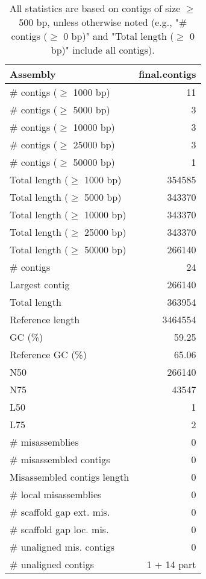 \documentclass[12pt,a4paper]{article}
\begin{document}
\begin{table}[ht]
\begin{center}
\caption{All statistics are based on contigs of size $\geq$ 500 bp, unless otherwise noted (e.g., "\# contigs ($\geq$ 0 bp)" and "Total length ($\geq$ 0 bp)" include all contigs).}
\begin{tabular}{|l*{1}{|r}|}
\hline
Assembly & final.contigs \\ \hline
\# contigs ($\geq$ 1000 bp) & 11 \\ \hline
\# contigs ($\geq$ 5000 bp) & 3 \\ \hline
\# contigs ($\geq$ 10000 bp) & 3 \\ \hline
\# contigs ($\geq$ 25000 bp) & 3 \\ \hline
\# contigs ($\geq$ 50000 bp) & 1 \\ \hline
Total length ($\geq$ 1000 bp) & 354585 \\ \hline
Total length ($\geq$ 5000 bp) & 343370 \\ \hline
Total length ($\geq$ 10000 bp) & 343370 \\ \hline
Total length ($\geq$ 25000 bp) & 343370 \\ \hline
Total length ($\geq$ 50000 bp) & 266140 \\ \hline
\# contigs & 24 \\ \hline
Largest contig & 266140 \\ \hline
Total length & 363954 \\ \hline
Reference length & 3464554 \\ \hline
GC (\%) & 59.25 \\ \hline
Reference GC (\%) & 65.06 \\ \hline
N50 & 266140 \\ \hline
N75 & 43547 \\ \hline
L50 & 1 \\ \hline
L75 & 2 \\ \hline
\# misassemblies & 0 \\ \hline
\# misassembled contigs & 0 \\ \hline
Misassembled contigs length & 0 \\ \hline
\# local misassemblies & 0 \\ \hline
\# scaffold gap ext. mis. & 0 \\ \hline
\# scaffold gap loc. mis. & 0 \\ \hline
\# unaligned mis. contigs & 0 \\ \hline
\# unaligned contigs & 1 + 14 part \\ \hline

\end{tabular}
\end{center}
\end{table}
\end{document}
